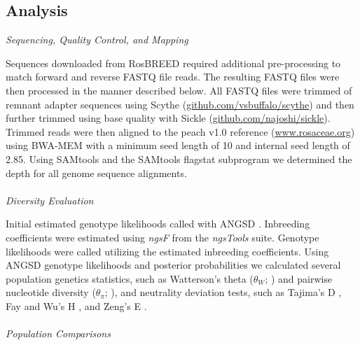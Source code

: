 \documentclass[12pt]{article}
\newcommand{\jri}[1]{\textcolor{red}{\emph{#1}}}
\newcommand{\dv}[1]{\textcolor{blue}{\emph{#1}}}
\begin{document}
\subsection*{Analysis}
\emph{Sequencing, Quality Control, and Mapping}

Sequences downloaded from RosBREED required additional pre-processing to match forward and reverse FASTQ file reads.
%
The resulting FASTQ files were then processed in the manner described below.
%
All FASTQ files were trimmed of remnant adapter sequences using Scythe (\url{github.com/vsbuffalo/scythe}) and then further trimmed using base quality with Sickle (\url{github.com/najoshi/sickle}). 
%
Trimmed reads were then aligned to the peach v1.0 reference (\url{www.rosaceae.org}) using BWA-MEM \citep{li2013aligning} with a minimum seed length of 10 and internal seed length of 2.85.
%
Using SAMtools and the SAMtools flagstat subprogram \citep{li2009sequence} we determined the depth for all genome sequence alignments.
\\
%
%
\\
\emph{Diversity Evaluation}

Initial estimated genotype likelihoods called with ANGSD \citep{korneliussen2014angsd}. 
%
Inbreeding coefficients were estimated using \emph{ngsF} from the \emph{ngsTools} \citep{fumagalli2014ngstools} suite.
%
Genotype likelihoods were called utilizing the estimated inbreeding coefficients. 
%
Using ANGSD genotype likelihoods and posterior probabilities we calculated several population genetics statistics, such as Watterson's theta ($\theta_{W}$; \citealp{watterson1975number}) and pairwise nucleotide diversity ($\theta_{\pi}$; \citealp{nei1979mathematical}), and neutrality deviation tests, such as Tajima's D \citep{tajima1989statistical}, Fay and Wu's H \citep{fay2000hitchhiking}, and Zeng's E \citep{zeng2006statistical}.
\\
%
\\
\emph{Population Comparisons}
\end{document}
